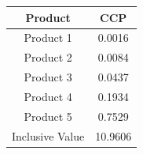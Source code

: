 \begin{table}[ht]
  \centering
  \begin{tabular}{cc}
    \toprule
    Product & CCP \\
    \midrule
    Product 1 & 0.0016 \\
    Product 2 & 0.0084 \\
    Product 3 & 0.0437 \\
    Product 4 & 0.1934 \\
    Product 5 & 0.7529 \\
    \midrule
    Inclusive Value & 10.9606 \\
    \bottomrule
  \end{tabular}
\end{table}
